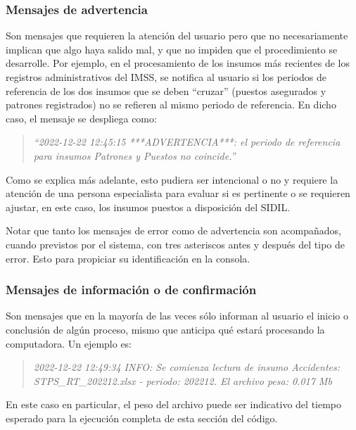 \documentclass[
]{article}
\begin{document}
\hypertarget{mensajesAdvertencia}{%
\subsubsection{Mensajes de advertencia}\label{mensajesAdvertencia}}

Son mensajes que requieren la atención del usuario pero que no necesariamente implican que algo haya salido mal, y que no impiden que el procedimiento se desarrolle. Por ejemplo, en el procesamiento de los insumos más recientes de los registros administrativos del IMSS, se notifica al usuario si los periodos de referencia de los dos insumos que se deben ``cruzar'' (puestos asegurados y patrones registrados) no se refieren al mismo periodo de referencia. En dicho caso, el mensaje se despliega como:

\begin{quote}
\emph{``2022-12-22 12:45:15 ***ADVERTENCIA***: el periodo de referencia para insumos Patrones y Puestos no coincide.''}
\end{quote}

Como se explica más adelante, esto pudiera ser intencional o no y requiere la atención de una persona especialista para evaluar si es pertinente o se requieren ajustar, en este caso, los insumos puestos a disposición del SIDIL.

Notar que tanto los mensajes de error como de advertencia son acompañados, cuando previstos por el sistema, con tres asteriscos antes y después del tipo de error. Esto para propiciar su identificación en la consola.

\hypertarget{mensajesConfirmacion}{%
\subsubsection{Mensajes de información o de confirmación}\label{mensajesConfirmacion}}

Son mensajes que en la mayoría de las veces sólo informan al usuario el inicio o conclusión de algún proceso, mismo que anticipa qué estará procesando la computadora. Un ejemplo es:

\begin{quote}
\emph{2022-12-22 12:49:34 INFO: Se comienza lectura de insumo Accidentes: STPS\_RT\_202212.xlsx - periodo: 202212. El archivo pesa: 0.017 Mb}
\end{quote}

En este caso en particular, el peso del archivo puede ser indicativo del tiempo esperado para la ejecución completa de esta sección del código.
\end{document}
